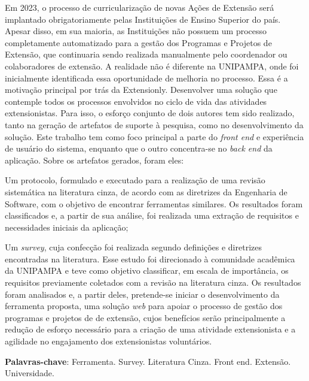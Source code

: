 \begin{resumo}
  Em 2023, o processo de curricularização de novas Ações de Extensão será implantado obrigatoriamente pelas Instituições de Ensino Superior do país. Apesar disso, em sua maioria, as Instituições não possuem um processo completamente automatizado para a gestão dos Programas e Projetos de Extensão, que continuaria sendo realizada manualmente pelo coordenador ou colaboradores de extensão. A realidade não é diferente na \acs{UNIPAMPA}, onde foi inicialmente identificada essa oportunidade de melhoria no processo. Essa é a motivação principal por trás da Extensionly. Desenvolver uma solução que contemple todos os processos envolvidos no ciclo de vida das atividades extensionistas. Para isso, o esforço conjunto de dois autores tem sido realizado, tanto na geração de artefatos de suporte à pesquisa, como no desenvolvimento da solução. Este trabalho tem como foco principal a parte do \textit{front end} e experiência de usuário do sistema, enquanto que o outro concentra-se no \textit{back end} da aplicação. Sobre os artefatos gerados, foram eles:
  \begin{inparaenum}[(a)]
    \item Um protocolo, formulado e executado para a realização de uma revisão sistemática na literatura cinza, de acordo com as diretrizes da Engenharia de Software, com o objetivo de encontrar ferramentas similares. Os resultados foram classificados e, a partir de sua análise, foi realizada uma extração de requisitos e necessidades iniciais da aplicação;
    \item Um \textit{survey}, cuja confecção foi realizada segundo definições e diretrizes encontradas na literatura. Esse estudo foi direcionado à comunidade acadêmica da \ac{UNIPAMPA} e teve como objetivo classificar, em escala de importância, os requisitos previamente coletados com a revisão na literatura cinza. Os resultados foram analisados e, a partir deles, pretende-se iniciar o desenvolvimento da ferramenta proposta, uma solução \textit{web} para apoiar o processo de gestão dos programas e projetos de de extensão, cujos benefícios serão principalmente a redução de esforço necessário para a criação de uma atividade extensionista e a agilidade no engajamento dos extensionistas voluntários.
  \end{inparaenum}

  \vspace{\onelineskip}

  \noindent
  \textbf{Palavras-chave}: Ferramenta. Survey. Literatura Cinza. Front end. Extensão. Universidade.
\end{resumo}
